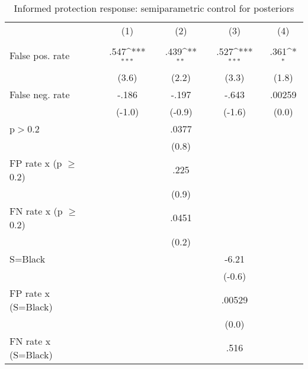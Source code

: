 \begin{table}[htbp]\centering
\def\sym#1{\ifmmode^{#1}\else\(^{#1}\)\fi}
\caption{Informed protection response: semiparametric control for posteriors}
\begin{tabular}{l*{4}{c}}
\hline\hline
                &\multicolumn{1}{c}{(1)}&\multicolumn{1}{c}{(2)}&\multicolumn{1}{c}{(3)}&\multicolumn{1}{c}{(4)}\\
                &\multicolumn{1}{c}{}&\multicolumn{1}{c}{}&\multicolumn{1}{c}{}&\multicolumn{1}{c}{}\\
\hline
False pos. rate &     .547\sym{***}&     .439\sym{**} &     .527\sym{***}&     .361\sym{*}  \\
                &    (3.6)         &    (2.2)         &    (3.3)         &    (1.8)         \\
False neg. rate &    -.186         &    -.197         &    -.643         &   .00259         \\
                &   (-1.0)         &   (-0.9)         &   (-1.6)         &    (0.0)         \\
p$>$0.2         &                  &    .0377         &                  &                  \\
                &                  &    (0.8)         &                  &                  \\
FP rate x (p $\geq$ 0.2)&                  &     .225         &                  &                  \\
                &                  &    (0.9)         &                  &                  \\
FN rate x (p $\geq$ 0.2)&                  &    .0451         &                  &                  \\
                &                  &    (0.2)         &                  &                  \\
S=Black         &                  &                  &    -6.21         &                  \\
                &                  &                  &   (-0.6)         &                  \\
FP rate x (S=Black)&                  &                  &   .00529         &                  \\
                &                  &                  &    (0.0)         &                  \\
FN rate x (S=Black)&                  &                  &     .516         &                  \\

\end{tabular}
\end{table}
